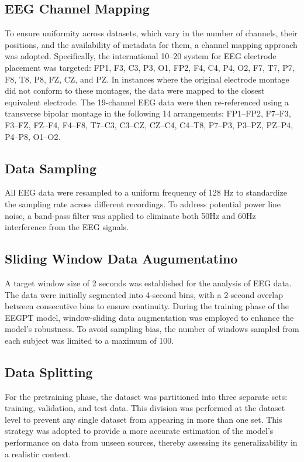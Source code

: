 \documentclass[final,3p,times,twocolumn]{elsarticle}
\begin{document}
\subsection{EEG Channel Mapping}
To ensure uniformity across datasets, which vary in the number of channels, their positions, and the availability of metadata for them, a channel mapping approach was adopted. Specifically, the international 10--20 system for EEG electrode placement was targeted: FP1, F3, C3, P3, O1, FP2, F4, C4, P4, O2, F7, T7, P7, F8, T8, P8, FZ, CZ, and PZ. In instances where the original electrode montage did not conform to these montages, the data were mapped to the closest equivalent electrode. The 19-channel EEG data were then re-referenced using a transverse bipolar montage in the following 14 arrangements: FP1--FP2, F7--F3, F3--FZ, FZ--F4, F4--F8, T7--C3, C3--CZ, CZ--C4, C4--T8, P7--P3, P3--PZ, PZ--P4, P4--P8, O1--O2.

\subsection{Data Sampling}
All EEG data were resampled to a uniform frequency of 128 Hz to standardize the sampling rate across different recordings. To address potential power line noise, a band-pass filter was applied to eliminate both 50Hz and 60Hz interference from the EEG signals.

\subsection{Sliding Window Data Augumentatino}
A target window size of 2 seconds was established for the analysis of EEG data. The data were initially segmented into 4-second bins, with a 2-second overlap between consecutive bins to ensure continuity. During the training phase of the EEGPT model, window-sliding data augmentation was employed to enhance the model's robustness. To avoid sampling bias, the number of windows sampled from each subject was limited to a maximum of 100.

\subsection{Data Splitting}
For the pretraining phase, the dataset was partitioned into three separate sets: training, validation, and test data. This division was performed at the dataset level to prevent any single dataset from appearing in more than one set. This strategy was adopted to provide a more accurate estimation of the model's performance on data from unseen sources, thereby assessing its generalizability in a realistic context.
\end{document}
